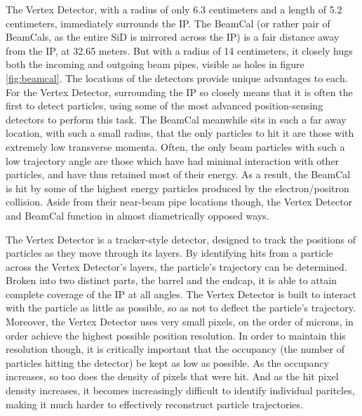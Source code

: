 \documentclass{report}
\begin{document}
                The Vertex Detector, with a radius of only 6.3 centimeters and a length of 5.2 centimeters, immediately surrounds the IP. The BeamCal (or rather pair of BeamCals, as the entire SiD is mirrored across the IP) is a fair distance away from the IP, at 32.65 meters. But with a radius of 14 centimeters, it closely hugs both the incoming and outgoing beam pipes, visible as holes in figure \ref{fig:beamcal}. The locations of the detectors provide unique advantages to each. For the Vertex Detector, surrounding the IP so closely means that it is often the first to detect particles, using some of the most advanced position-sensing detectors to perform this task. The BeamCal meanwhile sits in such a far away location, with such a small radius, that the only particles to hit it are those with extremely low transverse momenta. Often, the only beam particles with such a low trajectory angle are those which have had minimal interaction with other particles, and have thus retained most of their energy. As a result, the BeamCal is hit by some of the highest energy particles produced by the electron/positron collision. Aside from their near-beam pipe locations though, the Vertex Detector and BeamCal function in almost diametrically opposed ways.

                The Vertex Detector is a tracker-style detector, designed to track the positions of particles as they move through its layers. By identifying hits from a particle across the Vertex Detector's layers, the particle's trajectory can be determined. Broken into two distinct parts, the barrel and the endcap, it is able to attain complete coverage of the IP at all angles. The Vertex Detector is built to interact with the particle as little as possible, so as not to deflect the particle's trajectory. Moreover, the Vertex Detector uses very small pixels, on the order of microns, in order achieve the highest possible position resolution. In order to maintain this resolution though, it is critically important that the occupancy (the number of particles hitting the detector) be kept as low as possible. As the occupancy increases, so too does the density of pixels that were hit. And as the hit pixel density increases, it becomes increasingly difficult to identify individual paritcles, making it much harder to effectively reconstruct particle trajectories.
                
\end{document}
